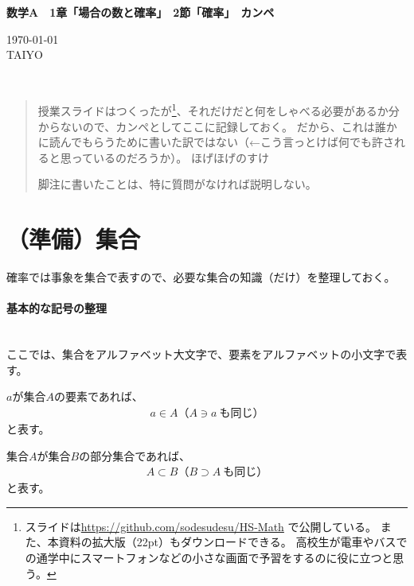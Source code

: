\documentclass[luatexja,fontsize=12pt]{jlreq}\usepackage{ifthen}\newcounter{enlarge}\setcounter{enlarge}{1}
\newcommand{\LS}[2]{\ifthenelse{\value{enlarge}=2 \OR \value{enlarge}=3}{#1}{#2}}
\newcommand{\LO}[1]{\LS{#1}{\relax}}
\begin{document}
{\Large%
\noindent
\textbf{%
数学A　1章「場合の数と確率」　2節「確率」　カンペ
\LO{\\ \color{teal} 〈拡大版〉}}
}

\begin{flushleft}
\today \\
TAIYO
\end{flushleft}

{\footnotesize%
\mbox{}\\

}
\begin{quotation}
授業スライドはつくったが\footnote{%
スライドは\url{https://github.com/sodesudesu/HS-Math}
で公開している。
また、本資料の拡大版（22pt）もダウンロードできる。
高校生が電車やバスでの通学中にスマートフォンなどの小さな画面で予習をするのに役に立つと思う。}、それだけだと何をしゃべる必要があるか分からないので、カンペとしてここに記録しておく。
だから、これは誰かに読んでもらうために書いた訳ではない（←こう言っとけば何でも許されると思っているのだろうか）。
ほげほげのすけ

脚注に書いたことは、特に質問がなければ説明しない。
\end{quotation}

\section{（準備）集合}

確率では事象を集合で表すので、必要な集合の知識（だけ）を整理しておく。
\mbox{}\\

\paragraph{基本的な記号の整理}\mbox{}\\
\indent
ここでは、集合をアルファベット大文字で、要素をアルファベットの小文字で表す。

$a$が集合$A$の要素であれば、
\begin{align} \label{eq:0_1}
a \in A　（A \ni a~も同じ）
\end{align}
と表す。

集合$A$が集合$B$の部分集合であれば、
\begin{align} \label{eq:0_2}
A \subset B　（B \supset A~も同じ）
\end{align}
と表す。
\end{document}
